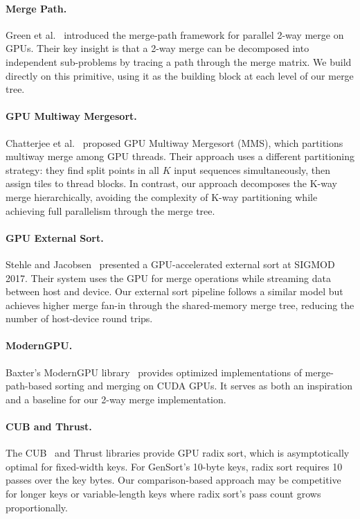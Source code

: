 \documentclass[conference,10pt]{IEEEtran}
\begin{document}
\paragraph{Merge Path.}
Green et al.~\cite{green2012} introduced the merge-path framework for
parallel 2-way merge on GPUs.  Their key insight is that a 2-way merge can
be decomposed into independent sub-problems by tracing a path through the
merge matrix.  We build directly on this primitive, using it as the
building block at each level of our merge tree.

\paragraph{GPU Multiway Mergesort.}
Chatterjee et al.~\cite{chatterjee2017} proposed GPU Multiway Mergesort
(MMS), which partitions multiway merge among GPU threads.  Their approach
uses a different partitioning strategy: they find split points in all $K$
input sequences simultaneously, then assign tiles to thread blocks.
In contrast, our approach decomposes the K-way merge hierarchically,
avoiding the complexity of K-way partitioning while achieving full
parallelism through the merge tree.

\paragraph{GPU External Sort.}
Stehle and Jacobsen~\cite{stehle2017} presented a GPU-accelerated external
sort at SIGMOD 2017.  Their system uses the GPU for merge operations while
streaming data between host and device.  Our external sort pipeline follows
a similar model but achieves higher merge fan-in through the shared-memory
merge tree, reducing the number of host-device round trips.

\paragraph{ModernGPU.}
Baxter's ModernGPU library~\cite{moderngpu2013} provides optimized
implementations of merge-path-based sorting and merging on CUDA GPUs.
It serves as both an inspiration and a baseline for our 2-way merge
implementation.

\paragraph{CUB and Thrust.}
The CUB~\cite{cub} and Thrust libraries provide GPU radix sort, which is
asymptotically optimal for fixed-width keys.  For GenSort's 10-byte keys,
radix sort requires 10 passes over the key bytes.  Our comparison-based
approach may be competitive for longer keys or variable-length keys where
radix sort's pass count grows proportionally.
\end{document}
